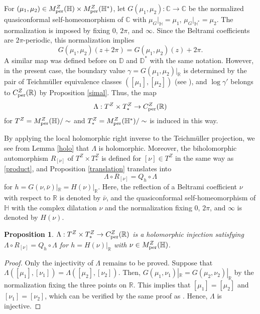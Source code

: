 \documentclass[amstex]{amsart}
\newtheorem{proposition}[theorem]{Proposition}
\theoremstyle{definition}
\theoremstyle{remark}
\numberwithin{equation}{section}
\begin{document}
For $(\mu_1, \mu_2) \in M^Z_{\rm per}(\mathbb H) \times M^Z_{\rm per}(\mathbb H^*)$, 
let $G(\mu_1, \mu_2): \mathbb C \to \mathbb C$ be the normalized quasiconformal self-homeomorphism of $\mathbb C$ with 
$\mu_G|_{\mathbb H} = \mu_1$, $\mu_G|_{\mathbb H^*} = \mu_2$.
The normalization is imposed by fixing $0$, $2\pi$, and $\infty$.
Since the Beltrami coefficients are $2\pi$-periodic, this normalization implies
$$
G(\mu_1,\mu_2)(z+2\pi)= G(\mu_1,\mu_2)(z)+2\pi.
$$
A similar map was defined before on $\mathbb D$ and $\mathbb D^*$ with the same notation.
However, in the present case,
the boundary value $\gamma = G(\mu_1, \mu_2)|_{\mathbb R}$ is determined by the pair of
Teichm\"uller equivalence classes $([\mu_1], [\mu_2])$ (see \cite[Proposition 4.1]{WM-3}), 
and $\log \gamma'$ belongs to $C^Z_{\rm per}(\mathbb R)$ by Proposition \ref{simal}. 
Thus, the map
$$
\Lambda: T^Z \times T^Z_* \to C^Z_{\rm per}(\mathbb R)
$$
for $T^Z=M^Z_{\rm per}(\mathbb H)/\sim$ and $T^Z_*=M^Z_{\rm per}(\mathbb H^*)/\sim$ is induced in this way.

By applying the local holomorphic right inverse to the Teichm\"uller projection, 
we see from Lemma \ref{holo} that $\Lambda$ is holomorphic. Moreover,
the biholomorphic automorphism $R_{[\nu]}$ of $T^Z \times T^Z_*$ is defined for $[\nu] \in T^Z$ in the same way as \eqref{product},
and Proposition \ref{translation} translates into 
\begin{equation}\label{relation}
\Lambda \circ R_{[\nu]} = Q_h \circ \Lambda
\end{equation}
for $h=G(\nu,\bar \nu)|_{\mathbb R}=H(\nu)|_{\mathbb R}$.
Here, the reflection of a Beltrami coefficient $\nu$ with respect to $\mathbb R$ is denoted by $\bar \nu$, and 
the quasiconformal self-homeomorphism of $\mathbb H$ with the complex dilatation $\nu$ and
the normalization fixing $0$, $2\pi$, and $\infty$ is denoted by $H(\nu)$.

\begin{proposition}\label{prop.5.1}
$\Lambda: T^Z \times T^Z_* \to C^Z_{\rm per}(\mathbb R)$ is a holomorphic injection satisfying
$\Lambda \circ R_{[\nu]} = Q_h \circ \Lambda$ for $h=H(\nu)|_{\mathbb R}$ with $\nu \in M^Z_{\rm per}(\mathbb H)$.
\end{proposition}

\begin{proof}
Only the injectivity of $\Lambda$ remains to be proved.
Suppose that 
\linebreak 
$\Lambda([\mu_1],[\nu_1])=\Lambda([\mu_2],[\nu_2])$. Then,
$G(\mu_1,\nu_1)|_{\mathbb R}=G(\mu_2,\nu_2)|_{\mathbb R}$ by the normalization fixing the three points on $\mathbb R$.
This implies that $[\mu_1]=[\mu_2]$ and $[\nu_1]=[\nu_2]$, which can be verified
by the same proof as \cite[Proposition 4.1]{WM-3}.
Hence, $\Lambda$ is injective.
\end{proof}
\end{document}
